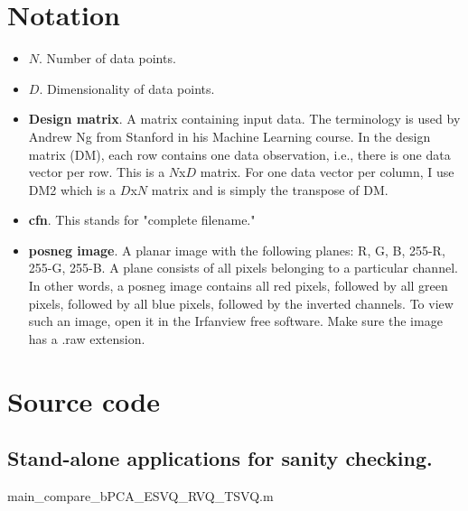 \documentclass[12pt]{article}
\begin{document}
\section{Notation}
\begin{itemize}
\item $N$. Number of data points.
\item $D$. Dimensionality of data points.
\item \textbf{Design matrix}.  A matrix containing input data.  The terminology is used by Andrew Ng from Stanford in his Machine Learning course.  In the design matrix (DM), each row contains one data observation, i.e., there is one data vector per row.  This is a $N$x$D$ matrix.  For one data vector per column, I use DM2 which is a $D$x$N$ matrix and is simply the transpose of DM.        
\item \textbf{cfn}.  This stands for "complete filename."
\item \textbf{posneg image}.  A planar image with the following planes: R, G, B, 255-R, 255-G, 255-B.  A plane consists of all pixels belonging to a particular channel.  In other words, a posneg image contains all red pixels, followed by all green pixels, followed by all blue pixels, followed by the inverted channels.  To view such an image, open it in the Irfanview free software.  Make sure the image has a .raw extension.
\end{itemize}  

\tiny
\newpage
\section{Source code}

\newpage
\subsection{Stand-alone applications for sanity checking.}
	{main_compare_bPCA_ESVQ_RVQ_TSVQ.m}

\newpage
\end{document}
